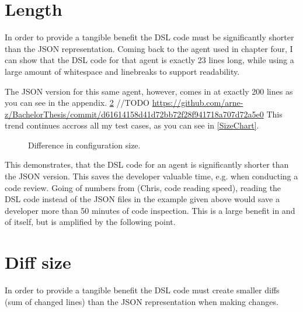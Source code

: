\section{Length}

In order to provide a tangible benefit the DSL code must be significantly shorter than the JSON representation. Coming back to the agent used in chapter four, I can show that the DSL code for that agent is exactly 23 lines long, while using a large amount of whitespace and linebreaks to support readability.

The JSON version for this same agent, however, comes in at exactly 200 lines as you can see in the appendix. \ref{} //TODO \url{https://github.com/arne-z/BachelorThesis/commit/d61614158d41d72bb72f28f941718a707d72a5e0}
This trend continues accross all my test cases, as you can see in \autoref{SizeChart}.
\begin{figure}
    \centering
    
    \caption{Difference in configuration size.}
    \label{SizeChart}
    
\end{figure}
This demonstrates, that the DSL code for an agent is significantly shorter than the JSON version. This saves the developer valuable time, e.g. when conducting a code review. Going of numbers from \citeNeeded (Chris, code reading speed), reading the DSL code instead of the JSON files in the example given above would save a developer more than 50 minutes of code inspection. This is a large benefit in and of itself, but is amplified by the following point.


\section{Diff size}
In order to provide a tangible benefit the DSL code must create smaller diffs (sum of changed lines) than the JSON representation when making changes.


